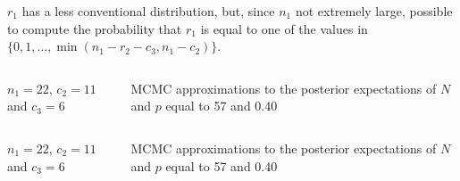 \begin{slide}
\vs\pause
$r_1$ has a less conventional distribution,  but, since $n_1$ not
extremely large, possible to compute the probability that $r_1$ is equal 
to one of the values in $\{0,1,\ldots,\min(n_1-r_2-c_3,n_1-c_2)\}$.

\end{slide}\begin{slide}

\begin{columns}
$n_1=22$, $c_2=11$ and $c_3=6$

MCMC approximations to the posterior expectations
of $N$ and $p$ equal to 57 and 0.40

\end{columns}

\end{slide}\begin{slide}

\begin{columns}
$n_1=22$, $c_2=11$ and $c_3=6$

MCMC approximations to the posterior expectations
of $N$ and $p$ equal to 57 and 0.40


\end{columns}
\end{slide}
